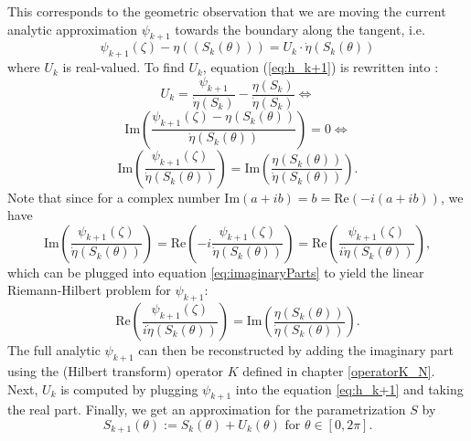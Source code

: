 This corresponds to the geometric observation that we are moving the current analytic approximation $\psi_{k+1}$ towards the boundary along the tangent, i.e.
\begin{equation}
    \psi_{k+1}(\zeta)-\eta((S_k(\theta))) = U_k \cdot \dot\eta(S_k(\theta))
\end{equation}
where $U_k$ is real-valued.
To find $U_k$, equation (\ref{eq:h_k+1}) is rewritten into \cite[Equation 3.4]{Wegmann1978_newtonverfahren}:
\begin{equation}
    U_k = \frac{\psi_{k+1}}{\dot\eta(S_k)} - \frac{\eta(S_k)}{\dot\eta(S_k)} \iff
\end{equation}
\begin{equation}
    \text{Im}(\frac{\psi_{k+1}(\zeta)-\eta(S_k(\theta))}{\dot\eta(S_k(\theta))})=0 \iff
\end{equation}
\begin{equation} \label{eq:imaginaryParts}
    \text{Im}(\frac{\psi_{k+1}(\zeta)}{\dot\eta(S_k(\theta))})= \text{Im}(\frac{\eta(S_k(\theta))}{\dot\eta(S_k(\theta))}).        
\end{equation}
Note that since for a complex number Im$(a+ib) = b = \text{Re}(-i(a+ib))$, we have
\begin{equation}
    \text{Im}(\frac{\psi_{k+1}(\zeta)}{\dot\eta(S_k(\theta))}) = \text{Re}(-i\frac{\psi_{k+1}(\zeta)}{\dot\eta(S_k(\theta))}) = \text{Re}(\frac{\psi_{k+1}(\zeta)}{i\dot\eta(S_k(\theta))}),
\end{equation}
which can be plugged into equation \eqref{eq:imaginaryParts} to yield the linear Riemann-Hilbert problem for $\psi_{k+1}$:
\begin{equation}\label{eq:RHproblem}
    \text{Re}(\frac{\psi_{k+1}(\zeta)}{i\dot\eta(S_k(\theta))})= \text{Im}(\frac{\eta(S_k(\theta))}{\dot\eta(S_k(\theta))}).
\end{equation}
The full analytic $\psi_{k+1}$ can then be reconstructed by adding the imaginary part \cite[Lemma 14.2]{Henrici1986_vol3} using the (Hilbert transform) operator $K$ defined in chapter \ref{operatorK_N}. 
Next, $U_k$ is computed by plugging $\psi_{k+1}$ into the equation \eqref{eq:h_k+1} and taking the real part.
Finally, we get an approximation for the parametrization $S$ by 
\begin{equation}
    S_{k+1}(\theta):= S_k(\theta)+U_k(\theta) \text{ for } \theta \in [0, 2\pi].
\end{equation}
\bigskip

